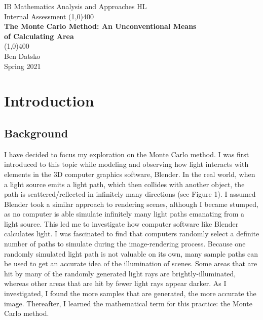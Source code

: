 \documentclass[11pt]{article}
\begin{document}
\begin{titlepage}
\begin{center}
\vspace*{1cm}
\Large{{IB Mathematics Analysis and Approaches HL}}\\
\Large{Internal Assessment}
\vfill
\line(1,0){400}\\[1mm]
\Large{\textbf{The Monte Carlo Method: An Unconventional Means\\of Calculating Area}}\\
\line(1,0){400}\\
\vfill
\normalsize Ben Datsko\\
Spring 2021
\end{center}
\end{titlepage}

\tableofcontents
\thispagestyle{empty}
\clearpage

\setcounter{page}{1}

\section{Introduction}
\subsection{Background}
I have decided to focus my exploration on the Monte Carlo method. I was first introduced to this topic while modeling and observing how light interacts with elements in the 3D computer graphics software, Blender. In the real world, when a light source emits a light path, which then collides with another object, the path is scattered/reflected in infinitely many directions (see Figure 1). I assumed Blender took a similar approach to rendering scenes, although I became stumped, as no computer is able simulate infinitely many light paths emanating from a light source. This led me to investigate how computer software like Blender calculates light. I was fascinated to find that computers randomly select a definite number of paths to simulate during the image-rendering process. Because one randomly simulated light path is not valuable on its own, many sample paths can be used to get an accurate idea of the illumination of scenes. Some areas that are hit by many of the randomly generated light rays are brightly-illuminated, whereas other areas that are hit by fewer light rays appear darker. As I investigated, I found the more samples that are generated, the more accurate the image. Thereafter, I learned the mathematical term for this practice: the Monte Carlo method.\\
\end{document}
